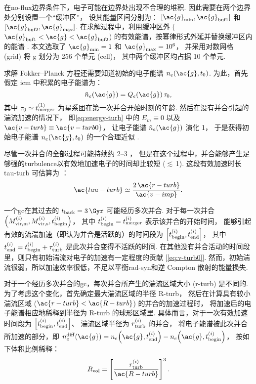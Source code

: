在\ac{no-flux}边界条件下，电子可能在边界处出现不合理的堆积.
因此需要在两个边界处分别设置一个\enquote{缓冲区}，
设其能量区间分别为：
$[\ac{g}_{\R{min}}, \ac{g}_{\R{buf1}}]$ 和
$[\ac{g}_{\R{buf2}}, \ac{g}_{\R{max}}]$.
在求解过程中，利用缓冲区外 ($\ac{g}_{\R{buf1}} < \ac{g} < \ac{g}_{\R{buf2}}$)
的有效能谱，按幂律形式外延并替换缓冲区内的能谱 \cite{borovsky1986,donnert2014}.
本文选取了 $\ac{g}_{\R{min}} = 1$ 和 $\ac{g}_{\R{max}} = \num{e6}$，
并采用对数网格 (grid) 将 \ac{g} 划分为 256 个单元 (cell)，
其中两个缓冲区均占据 10 个单元.

求解 Fokker--Planck 方程还需要知道初始的电子能谱 $n_e(\ac{g}, t_0)$.
为此，首先假定 \ac{icm} 中积累的电子能谱为：
\begin{equation}
  \tilde{n}_e(\ac{g}) = Q_e(\ac{g}) \,\tau_0 ,
\end{equation}
其中 $\tau_0 \simeq t_{\mathrm{merger}}^{(1)}$ 为星系团在第一次并合开始时刻的年龄.
然后在没有并合引起的湍流加速的情况下，
即\autoref{eq:energy-turb} 中的 $E_m \equiv 0$ 以及
$\ac{v-turb} \equiv \ac{v-turb0}$，
让电子能谱 $\tilde{n}_e(\ac{g})$ 演化 \SI{1}{\Gyr}，
于是获得初始电子能谱 $n_e(\ac{g}, t_0)$ 的一个合理近似 \cite{brunetti2007}.

尽管一次并合的全部过程可能持续约 \SIrange{2}{3}{\Gyr} \cite{tormen2004,cassano2016}，
但是在这个过程中，并合能够产生足够强的\ac{turbulence}以有效地加速电子的时间却比较短
($\lesssim$\,\SI{1}{\Gyr}).
这段有效加速时长 \ac{tau-turb} 可估算为 \cite{miniati2015}：
\begin{equation}
  \ac{tau-turb} \simeq \frac{2\,\ac{r-turb}}{\ac{v-imp}} .
\end{equation}

一个\ac{gc}在其过去的 $t_{\R{back}} = \SI{3}{\Gyr}$ 可能经历多次并合.
对于每一次并合
$\left( M^{(i)}_{\mathrm{vir,m}}, M^{(i)}_{\mathrm{vir,s}}, t^{(i)}_{\mathrm{begin}} \right)$，
其中 $t^{(i)}_{\mathrm{begin}} = t^{(i)}_{\mathrm{merger}}$ 表示该并合的开始时间，
能够引起有效的流湍加速（即认为并合是活跃的）的时间段为
$\left[ t^{(i)}_{\mathrm{begin}}, t^{(i)}_{\mathrm{end}} \right]$，
其中 $t^{(i)}_{\mathrm{end}} = t^{(i)}_{\mathrm{begin}}+\tau^{(i)}_{\mathrm{turb}}$
是此次并合变得不活跃的时间.
在其他没有并合活动的时间段里，则只有初始湍流对电子的加速有一定程度的贡献
[\autoref{eq:v-turb0}].
然而，初始湍流很弱，所以加速效率很低，不足以平衡\ac{rad-syn}和逆 Compton 散射的能量损失.

对于一个经历多次并合的\ac{gc}，每次并合所产生的湍流区域大小 (\ac{r-turb}) 是不同的.
为了考虑这个变化，首先确定最大湍流区域的半径 \ac{R-turb}，
然后在计算具有较小湍流区域 ($\ac{r-turb} < \ac{R-turb}$) 的并合的加速过程时，
将加速后的电子能谱相应地稀释到半径为 \ac{R-turb} 的球形区域里.
具体而言，对于一次有效加速时间段为
$\left[ t^{(i)}_{\mathrm{begin}}, t^{(i)}_{\mathrm{end}} \right]$、
湍流区域半径为 $r^{(i)}_{\mathrm{turb}}$ 的并合，
将电子能谱被此次并合所加速的部分，即
$n_e^{\R{diff}}(\ac{g}) =
n_e\!\left(\ac{g}, t^{(i)}_{\R{end}}\right) -
n_e\!\left(\ac{g}, t^{(i)}_{\R{begin}}\right)$，
按如下体积比例稀释：
\begin{equation}
  \label{eq:ratio-v}
  R_{\R{vol}} = \left[ \frac{r^{(i)}_{\R{turb}}}{\ac{R-turb}} \right]^3 .
\end{equation}

